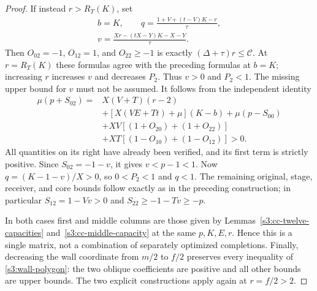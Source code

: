 \documentclass[11pt,reqno]{amsart}
\theoremstyle{definition}
\theoremstyle{remark}
\begin{document}
\begin{proof}
If instead \(r>R_T(K)\), set
\[
 \begin{gathered} b=K,\qquad q=\frac{1+V+(t-V)K-r}{\tau},\\
 v=\frac{Xr-(tX-Y)K-X-Y}{\tau}.\end{gathered}
\]
Then \(O_{02}=-1\), \(O_{12}=1\), and
\(O_{22}\ge-1\) is exactly
\((\Delta+\tau)r\le\mathcal C\).
At \(r=R_T(K)\) these formulas agree with the preceding formulas
at \(b=K\); increasing \(r\) increases \(v\) and decreases
\(P_2\). Thus \(v>0\) and \(P_2<1\).
The missing upper bound for \(v\) must not be assumed. It follows
from the independent identity
\[
\begin{split}
 \mu(p+S_{02})={}&X(V+T)(r-2)\\
 &+[X(VE+Tt)+\mu](K-b)+\mu(p-S_{00})\\
 &+XV[(1+O_{20})+(1+O_{22})]\\
 &+XT[(1-O_{10})+(1-O_{12})]>0.
\end{split}
\]
All quantities on its right have already been verified, and its first
term is strictly positive. Since \(S_{02}=-1-v\), it gives
\(v<p-1<1\). Now \(q=(K-1-v)/X>0\), so \(0<P_2<1\)
and \(q<1\). The remaining original, stage, receiver, and core
bounds follow exactly as in the preceding construction; in particular
\(S_{12}=1-Vv>0\) and \(S_{22}\ge-1-Tv\ge-p\).

In both cases first and middle columns are those given by
Lemmas~\ref{s3:cc-twelve-capacities} and~\ref{s3:cc-middle-capacity}
at the same \(p,K,E,r\). Hence this is a single matrix, not a
combination of separately optimized completions. Finally, decreasing
the wall coordinate from \(m/2\) to \(f/2\) preserves every
inequality of \eqref{s3:wall-polygon}: the two oblique coefficients
are positive and all other bounds are upper bounds. The two explicit
constructions apply again at \(r=f/2>2\).
\end{proof}
\end{document}
